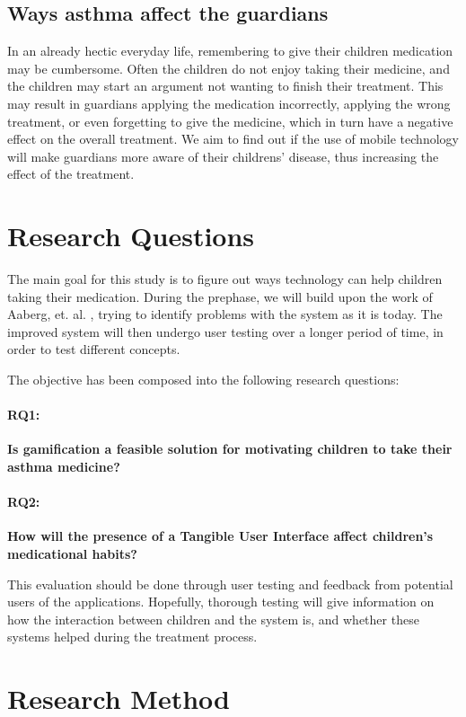 \subsection{Ways asthma affect the guardians}
In an already hectic everyday life, remembering to give their children medication may be cumbersome. Often the children do not enjoy taking their medicine, and the children may start an argument not wanting to finish their treatment. This may result in guardians applying the medication incorrectly, applying the wrong treatment, or even forgetting to give the medicine, which in turn have a negative effect on the overall treatment. We aim to find out if the use of mobile technology will make guardians more aware of their childrens' disease, thus increasing the effect of the treatment.  


\section{Research Questions}
\label{sec:researchquestions}
The main goal for this study is to figure out ways technology can help children taking their medication. During the prephase, we will build upon the work of Aaberg, et. al.  \cite{CustomerDriven}, trying to identify problems with the system as it is today. The improved system will then undergo user testing over a longer period of time, in order to test different concepts.


The objective has been composed into the following research questions: 

\paragraph{RQ1:}
\textbf{Is gamification a feasible solution for motivating children to take their asthma medicine?}


\paragraph{RQ2:}
\textbf{How will the presence of a Tangible User Interface affect children's medicational habits?}


This evaluation should be done through user testing and feedback from potential users of the applications. Hopefully, thorough testing will give information on how the interaction between children and the system is, and whether these systems helped during the treatment process.

\section{Research Method}
\label{sec:researchmethod}

